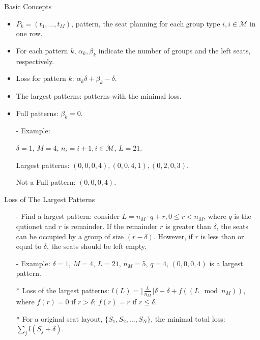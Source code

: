   \begin{frame}{Basic Concepts}
    \begin{itemize}
      \item $P_{k} = (t_1, \ldots, t_M)$, pattern, the seat planning for each group type $i, i \in \mathcal{M}$ in one row.
      \item For each pattern $k$, $\alpha_k, \beta_k$ indicate the number of groups and the left seats, respectively.
      \item Loss for pattern $k$: $\alpha_k \delta + \beta_k - \delta$.
      \item The largest patterns: patterns with the minimal loss. 
      \item Full patterns: $\beta_k =0$.
      \item[-] {\color{blue} Example}: 
      
      $\delta = 1$, $M =4$, $n_i = i+1, i \in \mathcal{M}$, $L = 21$.
      
      Largest patterns: $(0, 0, 0, 4), (0, 0, 4, 1), (0, 2, 0, 3)$.
      
      Not a Full pattern: $(0, 0, 0, 4)$.
    \end{itemize}
  \end{frame}


  \begin{frame}{Loss of The Largest Patterns}
    \begin{itemize}
      \item[-] Find a largest pattern: consider $L = n_{M} \cdot q + r, 0 \leq r < n_{M}$, where $q$ is the qutionet and $r$ is remainder. If the remainder $r$ is greater than $\delta$, the seats can be occupied by a group of size $(r-\delta)$. However, if $r$ is less than or equal to $\delta$, the seats should be left empty.
      \item[-] {\color{blue} Example}: $\delta =1$, $M =4$, $L=21$, $n_M = 5$, $q =4$, $(0,0,0,4)$ is a largest pattern.
      \item[*] Loss of the largest patterns: $l(L) = \lfloor \frac{L}{n_{M}} \rfloor \delta -\delta + f((L \mod n_{M}))$, where $f(r) =0$ if $r > \delta$; $f(r) = r$ if $r \leq \delta$.
      \item[*] For a original seat layout, $\{S_1, S_2, \ldots, S_{N}\}$, the minimal total loss: $\sum_{j} l(S_j + \delta)$.
    \end{itemize}
  \end{frame}
  
